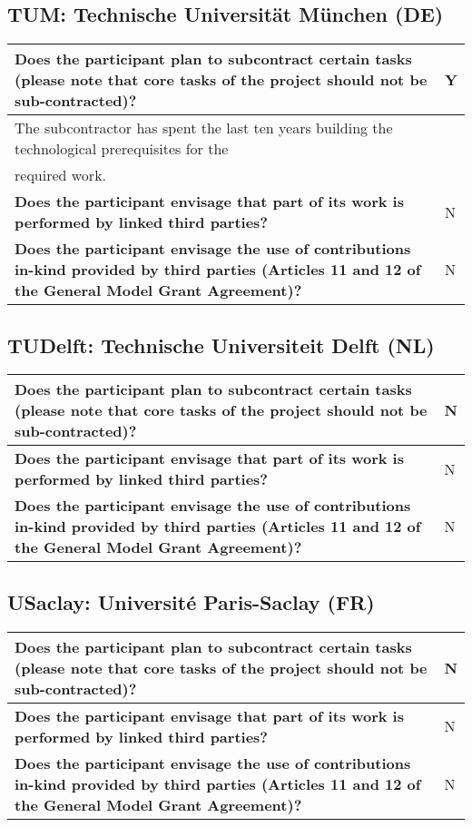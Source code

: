\subsection{TUM: Technische Universität München (DE)}

\begin{longtable}{|p{}|p{}|}
\hline
{\bf Does the participant plan to subcontract certain tasks (please
  note that core tasks of the project should not be sub-contracted)?}
&
Y
\\
\hline
\multicolumn{2}{|l|}{The subcontractor has spent the last ten years building the technological
  prerequisites for the}\\
\multicolumn{2}{|l|}{required work. }
\\
\hline
{\bf Does the participant envisage that  part of its work is performed
  by linked third parties?}
&
N
\\
\hline
{\bf Does the participant envisage the use of contributions in-kind
provided by third parties (Articles 11 and 12 of the General Model
Grant Agreement)?}
&
N
\\
\hline
\end{longtable}


\subsection{TUDelft: Technische Universiteit Delft (NL)}

\begin{longtable}{|p{}|p{}|}
\hline
{\bf Does the participant plan to subcontract certain tasks (please
  note that core tasks of the project should not be sub-contracted)?}
&
N
\\
\hline
{\bf Does the participant envisage that  part of its work is performed
  by linked third parties?}
&
N
\\
\hline
{\bf Does the participant envisage the use of contributions in-kind
provided by third parties (Articles 11 and 12 of the General Model
Grant Agreement)?}
&
N
\\
\hline
\end{longtable}


\subsection{USaclay: Université Paris-Saclay (FR)}

\begin{longtable}{|p{}|p{}|}
\hline
{\bf Does the participant plan to subcontract certain tasks (please
  note that core tasks of the project should not be sub-contracted)?}
&
N
\\
\hline
{\bf Does the participant envisage that  part of its work is performed
  by linked third parties?}
&
N
\\
\hline
{\bf Does the participant envisage the use of contributions in-kind
provided by third parties (Articles 11 and 12 of the General Model
Grant Agreement)?}
&
N
\\
\hline
\end{longtable}

